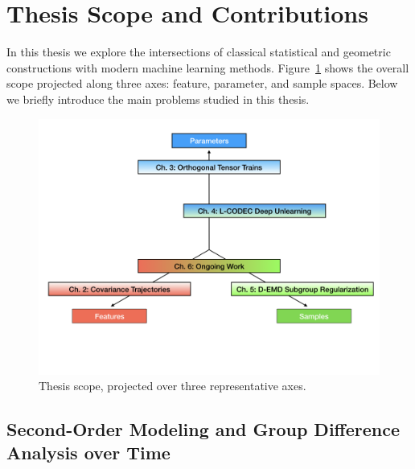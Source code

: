 \section{Thesis Scope and Contributions}

In this thesis we explore the intersections of classical statistical and geometric constructions with modern machine learning methods. 
Figure~\ref{fig:scope} shows the overall scope projected along three axes: feature, parameter, and sample spaces.
Below we briefly introduce the main problems studied in this thesis.
\begin{figure}[!ht]
    \centering
    \includegraphics[width=0.95\linewidth]{_introduction/thesis_scope.png}
    \caption{Thesis scope, projected over three representative axes.}
    \label{fig:scope}
\end{figure}

\subsection{Second-Order Modeling and Group Difference Analysis over Time}

